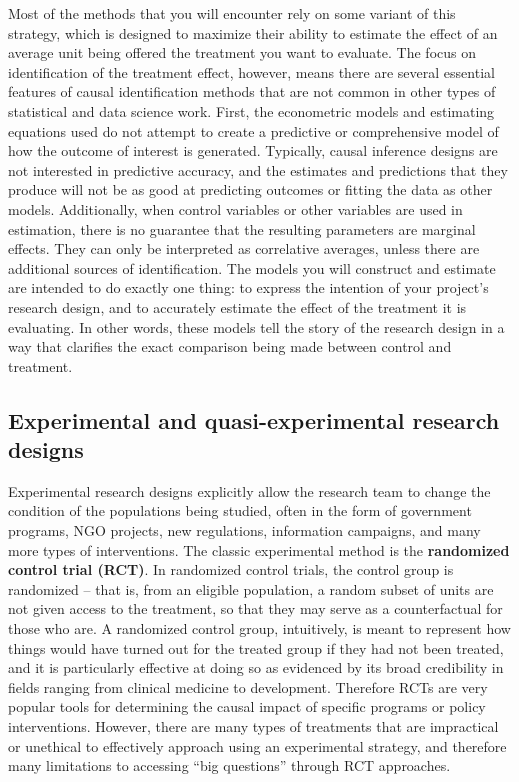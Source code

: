 Most of the methods that you will encounter rely on some variant of this strategy,
which is designed to maximize their ability to estimate the effect
of an average unit being offered the treatment you want to evaluate.
The focus on identification of the treatment effect, however,
means there are several essential features of causal identification methods
that are not common in other types of statistical and data science work.
First, the econometric models and estimating equations used
do not attempt to create a predictive or comprehensive model
of how the outcome of interest is generated.
Typically, causal inference designs are not interested in predictive accuracy,
and the estimates and predictions that they produce
will not be as good at predicting outcomes or fitting the data as other models.
Additionally, when control variables or other variables are used in estimation,
there is no guarantee that the resulting parameters are marginal effects.
They can only be interpreted as correlative averages,
unless there are additional sources of identification.
The models you will construct and estimate are intended to do exactly one thing:
to express the intention of your project's research design,
and to accurately estimate the effect of the treatment it is evaluating.
In other words, these models tell the story of the research design
in a way that clarifies the exact comparison being made between control and treatment.

\subsection{Experimental and quasi-experimental research designs}

Experimental research designs explicitly allow the research team
to change the condition of the populations being studied,
often in the form of government programs, NGO projects, new regulations,
information campaigns, and many more types of interventions.\cite{banerjee2009experimental}
The classic experimental method is the \textbf{randomized control trial (RCT)}.
In randomized control trials, the control group is randomized --
that is, from an eligible population,
a random subset of units are not given access to the treatment,
so that they may serve as a counterfactual for those who are.
A randomized control group, intuitively, is meant to represent
how things would have turned out for the treated group
if they had not been treated, and it is particularly effective at doing so
as evidenced by its broad credibility in fields ranging from clinical medicine to development.
Therefore RCTs are very popular tools for determining the causal impact
of specific programs or policy interventions.
However, there are many types of treatments that are impractical or unethical
to effectively approach using an experimental strategy,
and therefore many limitations to accessing ``big questions''
through RCT approaches.

